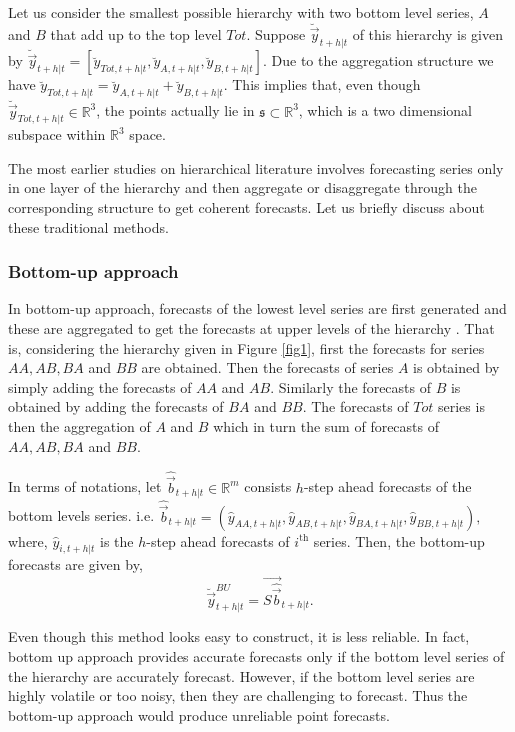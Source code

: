 \documentclass[graybox]{svmult}
\begin{document}
Let us consider the smallest possible hierarchy with two bottom level series, $A$ and $B$ that add up to the top level $Tot$. Suppose $\breve{\vec{y}}_{t+h|t}$ of this hierarchy is given by $\breve{\vec{y}}_{t+h|t} = [\breve{y}_{Tot,t+h|t},\breve{y}_{A,t+h|t}, \breve{y}_{B,t+h|t}]$. Due to the aggregation structure we have $\breve{y}_{Tot,t+h|t}=\breve{y}_{A,t+h|t}+\breve{y}_{B,t+h|t}$. This implies that, even though  $\breve{\vec{y}}_{Tot,t+h|t} \in \mathbb{R}^3$, the points actually lie in $\mathfrak{s}\subset \mathbb{R}^3$, which is a two dimensional subspace within $\mathbb{R}^3$ space. 

The most earlier studies on hierarchical literature involves forecasting series only in one layer of the hierarchy and then aggregate or disaggregate through the corresponding structure to get coherent forecasts. Let us briefly discuss about these traditional methods.  


\subsubsection{Bottom-up approach}

In bottom-up approach, forecasts of the lowest level series are first generated and these are  aggregated to get the forecasts at upper levels of the hierarchy \citep{dunn1976}. That is, considering the hierarchy given in Figure \ref{fig1}, first the forecasts for series $AA, AB, BA$ and $BB$ are obtained. Then the forecasts of series $A$ is obtained by simply adding the forecasts of $AA$ and $AB$. Similarly the forecasts of $B$ is obtained by adding the forecasts of $BA$ and $BB$. The forecasts of  $Tot$ series is then the aggregation of $A$ and $B$ which in turn the sum of forecasts of $AA, AB, BA$ and $BB$. 

In terms of notations, let $\hat{\vec{b}}_{t+h|t} \in \mathbb{R}^m$ consists $h$-step ahead forecasts of the bottom levels series. i.e. $\hat{\vec{b}}_{t+h|t} = (\hat{{y}}_{AA,t+h|t}, \hat{{y}}_{AB,t+h|t}, \hat{{y}}_{BA,t+h|t}, \hat{{y}}_{BB,t+h|t}),$ where, $\hat{{y}}_{i,t+h|t}$ is the $h$-step ahead forecasts of $i^\text{th}$ series. Then, the bottom-up forecasts are given by,
\begin{equation}\label{eq:03}
\breve{\vec{y}}^{BU}_{t+h|t}=\vec{S\hat{\vec{b}}}_{t+h|t}.
\end{equation}

Even though this method looks easy to construct, it is less reliable. In fact, bottom up approach provides accurate forecasts only if the bottom level series of the hierarchy are accurately forecast. However, if the bottom level series are highly volatile or too noisy, then they are challenging to forecast. Thus the bottom-up approach would produce unreliable point forecasts. 
\end{document}
